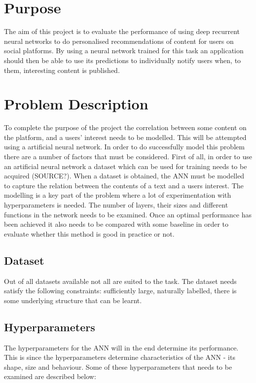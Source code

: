 \section{Purpose}
The aim of this project is to evaluate the performance of using deep recurrent neural networks to do personalised recommendations of content for users on social platforms. By using a neural network trained for this task an application should then be able to use its predictions to individually notify users when, to them, interesting content is published.

\section{Problem Description}
To complete the purpose of the project the correlation between some content on the platform, and a users' interest needs to be modelled. This will be attempted using a artificial neural network. In order to do successfully model this problem there are a number of factors that must be considered. First of all, in order to use an artificial neural network a dataset which can be used for training needs to be acquired (SOURCE?). When a dataset is obtained, the ANN must be modelled to capture the relation between the contents of a text and a users interest. The modelling is a key part of the problem where a lot of experimentation with hyperparameters is needed. The number of layers, their sizes and different functions in the network needs to be examined. Once an optimal performance has been achieved it also needs to be compared with some baseline in order to evaluate whether this method is good in practice or not.

\subsection{Dataset}
Out of all datasets available not all are suited to the task. The dataset needs satisfy the following constraints: sufficiently large, naturally labelled, there is some underlying structure that can be learnt.

\subsection{Hyperparameters}
The hyperparameters for the ANN will in the end determine its performance. This is since the hyperparameters determine characteristics of the ANN - its shape, size and behaviour. Some of these hyperparameters that needs to be examined are described below:

